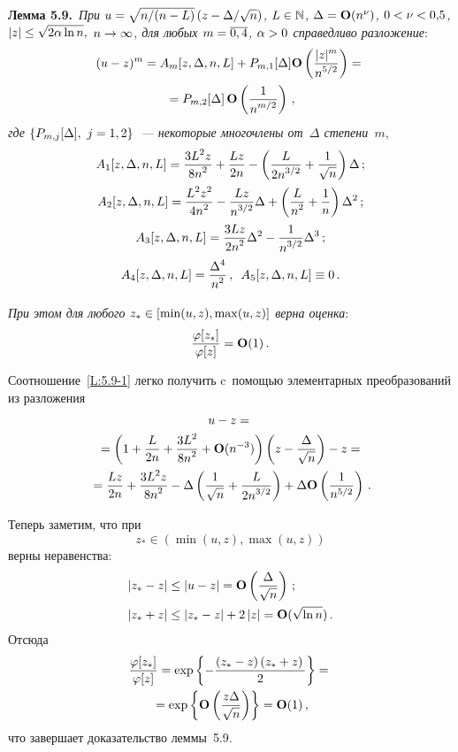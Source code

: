 \begin{multicols}{2}
\noindent
\textbf{Лемма 5.9.}\
\textit{При $u\hm=\sqrt{{n}/(n-L)}\left(z-{\Delta}/{\sqrt{n}}\right)$,
  $L\hm\in \Np$,  $\Delta\hm=\Op(n^\nu)$, $0\hm<\nu\hm<0{,}5$,
  $|z|\hm\le \sqrt{2\alpha\ln n},$ $n\hm\rightarrow\infty$,
  для любых $m\hm=\overline{0,4}$, $\alpha\hm>0$ справедливо разложение}:
 \begin{multline}
(u-z)^m=A_m[z,\Delta,n,L]+P_{m,1}[\Delta]\Op\left(
\fr{|z|^m}{n^{5/2}}\right)={}\\
{}=
 P_{m,2}[\Delta]\,\Op\left( \fr{1}{n^{m/2}}\right)\,,
 \label{L:5.9-1}
 \end{multline}
 \textit{где $\{P_{m,j}[\Delta],\ j\hm=1,2\}$~--- некоторые многочлены от~$\Delta$ степени~$m$},
 \begin{gather*}
A_1[z,\Delta,n,L]=\fr{3 L^2 z}{8 n^2}+\fr{L z}{2 n}
  -\left(\fr{L}{2 n^{3/2}}+\fr{1}{\sqrt{n}}\right) \Delta\,;
\\
 A_2[z,\Delta,n,L]=\fr{L^2 z^2}{4 n^2}- \fr{L z}{n^{3/2}} \Delta +\left(\fr{L}{n^2}  +\fr{1}{n}\right) \Delta ^2\,;
\\
 A_3[z,\Delta,n,L]=\fr{3 L z}{2 n^2}  \Delta^2-\fr{1}{n^{3/2}}\Delta^3\,;\\
 A_4[z,\Delta,n,L]= \fr{\Delta^4}{n^2}\,,\enskip
 A_5[z,\Delta,n,L]\equiv 0\,.
 \end{gather*}

 \textit{При этом для любого $z_*\hm\in \left[\min (u,z),\max (u,z)\right]$ верна оценка}:
 \begin{equation*}
\fr{ \varphi[z_*]}{\varphi[z]}=\Op(1)\,.
 \end{equation*}

 \Do
 Соотношение~\eqref{L:5.9-1} легко получить c~помощью элементарных
 преобразований из разложения
 \begin{multline*}
 u-z= {}\\
 {}= \left(1+\fr{L}{2 n}+\fr{3L^2}{8 n^2}+\Op(n^{-3})\right)
  \left(z-\fr{\Delta }{\sqrt{n}}\right)-z={}
\\
{} =\fr{L z}{2 n}+\fr{3 L^2 z}{8 n^2}
 -\Delta \left(\fr{1}{\sqrt{n}}+\fr{L}{2 n^{3/2}}\right)
 +\Delta \Op\left(\frac{1}{n^{5/2}}\right)\,.
 \end{multline*}

 Теперь заметим, что при 
 $$
 z_*\in \left(\min (u,z),\max (u,z)\right)
 $$ 
 верны  неравенства:
 \begin{align*}
  \left|z_*-z \right|&\le  \left|u-z \right|=
  \Op\left(\fr{\Delta}{\sqrt{n}}\right)\,;\\
 \left|z_*+z \right|&\le  \left|z_*-z \right|+2\left|z \right|=\Op(\sqrt{\ln n})\,.
 \end{align*}
 Отсюда
 \begin{multline*}
 \fr{\varphi[z_*]}{\varphi[z]}=
 \exp\left\{-\fr{\left(z_*-z \right)\left(z_*+z \right)}{2} \right\}={}\\
 {}=
 \exp\left\{\Op\left(\fr{z\Delta}{\sqrt{n}}\right) \right\}=\Op(1)\,,
 \end{multline*}
 что завершает доказательство леммы~5.9.


\end{multicols}
